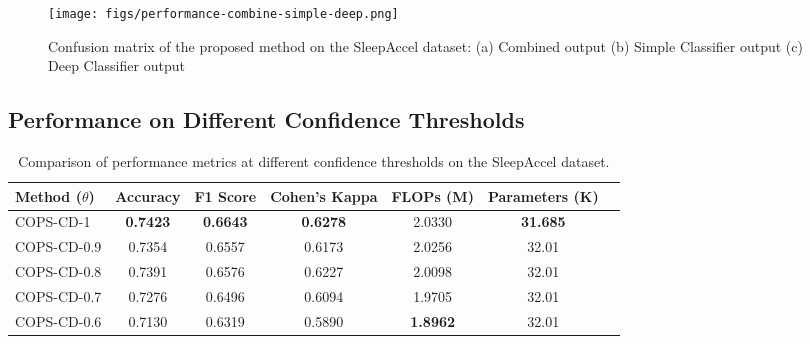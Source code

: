 

\begin{figure}
    \centering
    \texttt{[image: figs/performance-combine-simple-deep.png]}
    \caption{Confusion matrix of the proposed method on the SleepAccel dataset: (a) Combined output (b) Simple Classifier output (c) Deep Classifier output}
    \label{fig:performance-combine-simple-deep}
\end{figure}

\subsection{Performance on Different Confidence Thresholds}

\begin{table}[ht]
    \centering
    \begin{tabular}{lcccccc}
        \toprule
        Method (\(\theta\)) & Accuracy & F1 Score & Cohen's Kappa & FLOPs (M) & Parameters (K) \\
        \midrule
        COPS-CD-1 & \textbf{0.7423} & \textbf{0.6643} & \textbf{0.6278} & 2.0330 & \textbf{31.685}\\
        COPS-CD-0.9 & 0.7354 & 0.6557 & 0.6173 & 2.0256 & 32.01 \\
        COPS-CD-0.8 & 0.7391 & 0.6576 & 0.6227 & 2.0098 & 32.01 \\
        COPS-CD-0.7 & 0.7276 & 0.6496 & 0.6094 & 1.9705 & 32.01 \\
        COPS-CD-0.6 & 0.7130 & 0.6319 & 0.5890 & \textbf{1.8962} & 32.01 \\
        \bottomrule
    \end{tabular}
    \caption{Comparison of performance metrics at different confidence thresholds on the SleepAccel dataset.}
    \label{tab:performance_of_different_confidence}
\end{table}

